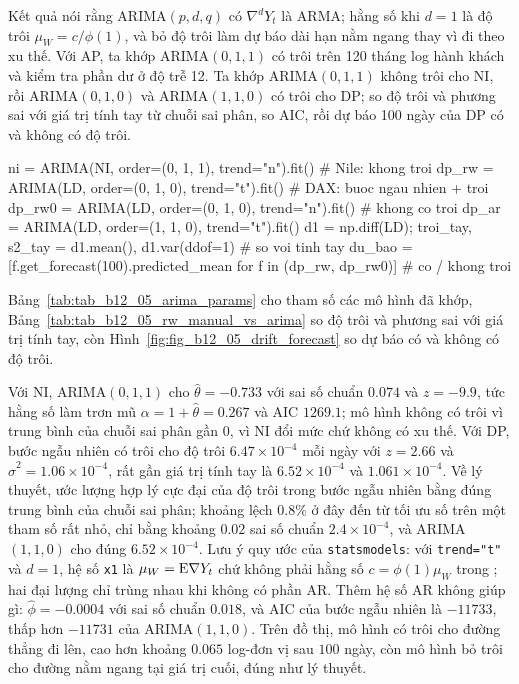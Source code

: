  Kết quả  nói rằng ARIMA$(p,d,q)$ có $\nabla^dY_t$ là ARMA; hằng số khi $d=1$ là độ trôi $\mu_W=c/\phi(1)$, và bỏ độ trôi làm dự báo dài hạn nằm ngang thay vì đi theo xu thế.
 Với AP, ta khớp ARIMA$(0,1,1)$ có trôi trên 120 tháng log hành khách và kiểm tra phần dư ở độ trễ 12. Ta khớp ARIMA$(0,1,1)$ không trôi cho NI, rồi ARIMA$(0,1,0)$ và ARIMA$(1,1,0)$ có trôi cho DP; so độ trôi và phương sai với giá trị tính tay từ chuỗi sai phân, so AIC, rồi dự báo 100 ngày của DP có và không có độ trôi.
\begin{codeblock}
ni = ARIMA(NI, order=(0, 1, 1), trend="n").fit()               # Nile: khong troi
dp_rw = ARIMA(LD, order=(0, 1, 0), trend="t").fit()            # DAX: buoc ngau nhien + troi
dp_rw0 = ARIMA(LD, order=(0, 1, 0), trend="n").fit()           # khong co troi
dp_ar = ARIMA(LD, order=(1, 1, 0), trend="t").fit()
d1 = np.diff(LD); troi_tay, s2_tay = d1.mean(), d1.var(ddof=1) # so voi tinh tay
du_bao = [f.get_forecast(100).predicted_mean for f in (dp_rw, dp_rw0)]   # co / khong troi
\end{codeblock}
 Bảng~\ref{tab:tab_b12_05_arima_params} cho tham số các mô hình đã khớp, Bảng~\ref{tab:tab_b12_05_rw_manual_vs_arima} so độ trôi và phương sai với giá trị tính tay, còn Hình~\ref{fig:fig_b12_05_drift_forecast} so dự báo có và không có độ trôi.


 Với NI, ARIMA$(0,1,1)$ cho $\hat\theta=-0.733$ với sai số chuẩn $0.074$ và $z=-9.9$, tức hằng số làm trơn mũ $\alpha=1+\hat\theta=0.267$ và AIC $1269.1$; mô hình không có trôi vì trung bình của chuỗi sai phân gần $0$, vì NI đổi mức chứ không có xu thế. Với DP, bước ngẫu nhiên có trôi cho độ trôi $6.47\times10^{-4}$ mỗi ngày với $z=2.66$ và $\hat\sigma^2=1.06\times10^{-4}$, rất gần giá trị tính tay là $6.52\times10^{-4}$ và $1.061\times10^{-4}$. Về lý thuyết, ước lượng hợp lý cực đại của độ trôi trong bước ngẫu nhiên bằng đúng trung bình của chuỗi sai phân; khoảng lệch $0.8\%$ ở đây đến từ tối ưu số trên một tham số rất nhỏ, chỉ bằng khoảng $0.02$ sai số chuẩn $2.4\times10^{-4}$, và ARIMA$(1,1,0)$ cho đúng $6.52\times10^{-4}$. Lưu ý quy ước của \texttt{statsmodels}: với \texttt{trend="t"} và $d=1$, hệ số \texttt{x1} là $\mu_W=\mathrm{E}\nabla Y_t$ chứ không phải hằng số $c=\phi(1)\mu_W$ trong ; hai đại lượng chỉ trùng nhau khi không có phần AR. Thêm hệ số AR không giúp gì: $\hat\phi=-0.0004$ với sai số chuẩn $0.018$, và AIC của bước ngẫu nhiên là $-11733$, thấp hơn $-11731$ của ARIMA$(1,1,0)$. Trên đồ thị, mô hình có trôi cho đường thẳng đi lên, cao hơn khoảng $0.065$ log-đơn vị sau $100$ ngày, còn mô hình bỏ trôi cho đường nằm ngang tại giá trị cuối, đúng như lý thuyết.

